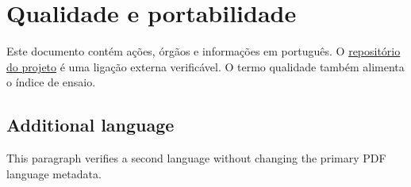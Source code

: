 \documentclass{article}
\title{\ABNTEXmetadata{titulo}}
\author{\ABNTEXmetadata{autoria}}
\date{2026}
\begin{document}
\maketitle
\tableofcontents

\section{Qualidade e portabilidade}

Este documento contém ações, órgãos e informações em português. O
\href{https://github.com/dantasrs/abntex3-community}{repositório do projeto}
é uma ligação externa verificável. O termo qualidade também
alimenta o índice de ensaio.

\begin{otherlanguage}{english}
\section{Additional language}

This paragraph verifies a second language without changing the primary PDF
language metadata.
\end{otherlanguage}
\end{document}
